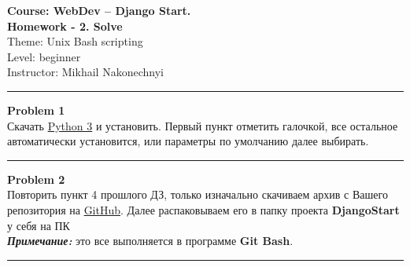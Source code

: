 \documentclass[a4paper, 11pt]{extarticle}
\newenvironment{problem}[2][Problem]
    { \begin{mdframed}[backgroundcolor=gray!20] \textbf{#1 #2} \\}
    {  \end{mdframed}}
\begin{document}

\noindent \LARGE{\textbf{Course: WebDev -- Django Start.}} \hfill  \\ 
\textbf{Homework - 2. Solve}  \hfill  \\

\noindent Theme: Unix Bash scripting \hfill  \\
Level: beginner\\
Instructor: Mikhail Nakonechnyi \\
\noindent\rule{6.257in}{2.8pt}

\begin{problem}{1}
Скачать \href{https://www.python.org/download}{Python 3} и установить. Первый пункт отметить галочкой, все остальное автоматически установится, или параметры по умолчанию далее выбирать.
\end{problem}
\noindent\rule{6.257in}{2.8pt}



\begin{problem}{2}
Повторить пункт 4 прошлого ДЗ, только изначально скачиваем архив с Вашего репозитория на \href{https://github.com/}{GitHub}. Далее распаковываем его в папку проекта \textbf{DjangoStart} у себя на ПК \\
\textit{\textbf{Примечание: }}это все выполняется в программе \textbf{Git Bash}. 
\end{problem}
\noindent\rule{6.257in}{2.8pt}


\end{document}
